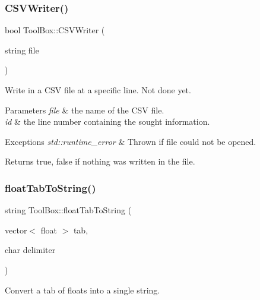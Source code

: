 \subsubsection{\texorpdfstring{C\+S\+V\+Writer()}{CSVWriter()}}
{\footnotesize\ttfamily bool Tool\+Box\+::\+C\+S\+V\+Writer (\begin{DoxyParamCaption}\item[{string}]{file }\end{DoxyParamCaption})}



Write in a C\+SV file at a specific line. Not done yet. 


\begin{DoxyParams}{Parameters}
{\em file} & the name of the C\+SV file. \\
\hline
{\em id} & the line number containing the sought information. \\
\hline
\end{DoxyParams}

\begin{DoxyExceptions}{Exceptions}
{\em std\+::runtime\+\_\+error} & Thrown if {\ttfamily file} could not be opened. \\
\hline
\end{DoxyExceptions}
\begin{DoxyReturn}{Returns}
true, false if nothing was written in the file. 
\end{DoxyReturn}
\mbox{\label{class_tool_box_a268881f9f0d13d7bf048b7c647376e65}} 
\subsubsection{\texorpdfstring{float\+Tab\+To\+String()}{floatTabToString()}}
{\footnotesize\ttfamily string Tool\+Box\+::float\+Tab\+To\+String (\begin{DoxyParamCaption}\item[{vector$<$ float $>$}]{tab,  }\item[{char}]{delimiter }\end{DoxyParamCaption})}



Convert a tab of floats into a single string. 


